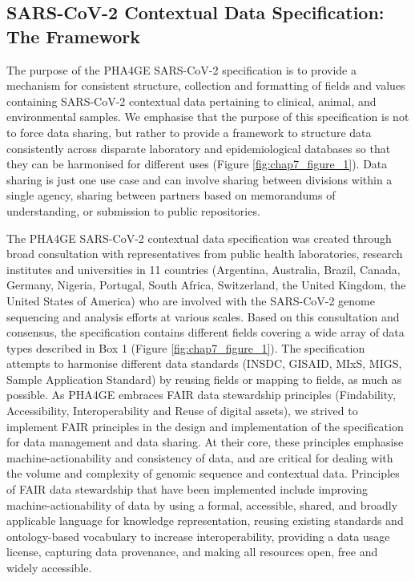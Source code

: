 \subsection{SARS-CoV-2 Contextual Data Specification: The Framework}

The purpose of the PHA4GE SARS-CoV-2 specification is to provide a mechanism for consistent structure, collection and formatting of fields and values containing SARS-CoV-2 contextual data pertaining to clinical, animal, and environmental samples. We emphasise that the purpose of this specification is not to force data sharing, but rather to provide a framework to structure data consistently across disparate laboratory and epidemiological databases so that they can be harmonised for different uses (Figure \ref{fig:chap7_figure_1}). Data sharing is just one use case and can involve sharing between divisions within a single agency, sharing between partners based on memorandums of understanding, or submission to public repositories. 

The PHA4GE SARS-CoV-2 contextual data specification was created through broad consultation with representatives from public health laboratories, research institutes and universities in 11 countries (Argentina, Australia, Brazil, Canada, Germany, Nigeria, Portugal, South Africa, Switzerland, the United Kingdom, the United States of America) who are involved with the SARS-CoV-2 genome sequencing and analysis efforts at various scales. Based on this consultation and consensus, the specification contains different fields covering a wide array of data types described in Box 1 (Figure \ref{fig:chap7_figure_1}). The specification attempts to harmonise different data standards (INSDC, GISAID, MIxS, MIGS, Sample Application Standard) by reusing fields or mapping to fields, as much as possible. As PHA4GE embraces FAIR data stewardship principles (Findability, Accessibility, Interoperability and Reuse of digital assets), we strived to implement FAIR principles in the design and implementation of the specification for data management and data sharing. At their core, these principles emphasise machine-actionability and consistency of data, and are critical for dealing with the volume and complexity of genomic sequence and contextual data. Principles of FAIR data stewardship that have been implemented include improving machine-actionability of data by using a formal, accessible, shared, and broadly applicable language for knowledge representation, reusing existing standards and ontology-based vocabulary to increase interoperability, providing a data usage license, capturing data provenance, and making all resources open, free and widely accessible.

